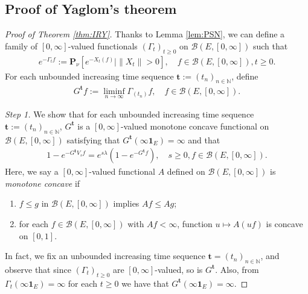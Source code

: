 \documentclass[12pt,a4paper]{amsart}
\numberwithin{equation}{section}
\theoremstyle{plain}
\theoremstyle{definition}
\begin{document}
\subsection{Proof of Yaglom's theorem}
\label{sec:MY}
\begin{proof}[Proof of Theorem \ref{thm:IRY}]

Thanks to Lemma \ref{lem:PSN}, we can define a family of $[0,\infty]$-valued functionals $(\Gamma_t)_{t\geq 0}$ on $\mathcal B(E, [0,\infty])$ such that
\begin{align}
  e^{-\Gamma_t f}
  := \mathbf P_{\nu}[e^{- X_t(f)}| \|X_t\| > 0], 
  \quad f\in \mathcal B(E,[0,\infty]), t \geq 0.
\end{align}
For each unbounded increasing time sequence $\mathbf t:= (t_n)_{n\in \mathbb N}$, define
\begin{align}
  G^{\mathbf t}f 
  := \liminf_{n\to \infty} \Gamma_{(t_n)}f,
  \quad f\in \mathcal B(E, [0,\infty]).
\end{align}

\emph{Step 1.}
We show that for each unbounded increasing time sequence $\mathbf t:= (t_n)_{n\in \mathbb N}$, $G^{\mathbf t}$ is a $[0,\infty]$-valued monotone concave functional on $\mathcal B(E,[0,\infty])$ satisfying that $G^{\mathbf t}(\infty \mathbf 1_E) = \infty$ and that
\begin{align}
  \label{eq:MY1}
  1 - e^{- G^{\mathbf t}V_sf} 
  = e^{s\lambda} (1- e^{- G^{\mathbf t} f}),
  \quad s \geq 0, f \in \mathcal B(E, [0,\infty]).
\end{align}
Here, we say a $[0,\infty]$-valued functional $A$ defined on $\mathcal B(E,[0,\infty])$ is \emph{monotone concave} if 
\begin{enumerate}
\item
  $f\leq g$ in $\mathcal B(E,[0,\infty])$ implies $Af\leq Ag$;
\item
  for each $f\in \mathcal B(E,[0,\infty])$ with $Af<\infty$, function $u\mapsto A(uf)$ is concave on $[0, 1]$.  
\end{enumerate}

In fact, we fix an unbounded increasing time sequence $\mathbf t = (t_n)_{n\in \mathbb N}$, and observe that since $(\Gamma_t)_{t\geq 0}$ are $[0,\infty]$-valued, so is $G^{\mathbf t}$. 
Also, from $\Gamma_t(\infty \mathbf 1_E) = \infty$ for each $t\geq 0$ we have that $G^{\mathbf t}(\infty \mathbf 1_E) = \infty$.


\end{proof}
\end{document}
